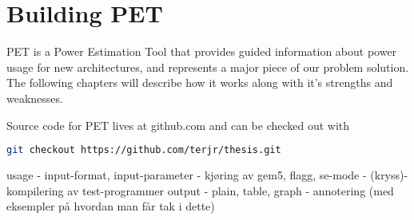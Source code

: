 \chapter{Building PET}
PET is a Power Estimation Tool that provides guided information about power
usage for new architectures, and represents a major piece of our problem
solution. The following chapters will describe how it works along with it's
strengths and weaknesses.

\noindent Source code for PET lives at github.com and can be checked out with
\begin{lstlisting}[language=bash]
git checkout https://github.com/terjr/thesis.git
\end{lstlisting}







usage
- input-format, input-parameter
- kjøring av gem5, flagg, se-mode
- (kryss)-kompilering av test-programmer
output
- plain, table, graph
- annotering (med eksempler på hvordan man får tak i dette)
